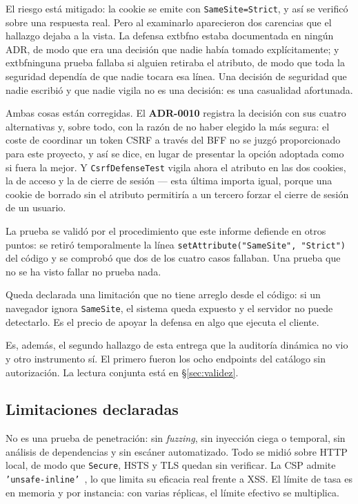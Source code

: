 \documentclass[11pt,a4paper]{article}
\newcommand{\adr}[1]{\textbf{ADR-#1}}
\begin{document}
El riesgo está mitigado: la cookie se emite con \texttt{SameSite=Strict}, y así
se verificó sobre una respuesta real. Pero al examinarlo aparecieron dos
carencias que el hallazgo dejaba a la vista. La defensa 	extbf{no estaba documentada
en ningún ADR}, de modo que era una decisión que nadie había tomado
explícitamente; y 	extbf{ninguna prueba fallaba si alguien retiraba el atributo}, de
modo que toda la seguridad dependía de que nadie tocara esa línea. Una decisión
de seguridad que nadie escribió y que nadie vigila no es una decisión: es una
casualidad afortunada.

Ambas cosas están corregidas. El \adr{0010} registra la decisión con sus cuatro
alternativas y, sobre todo, con la razón de no haber elegido la más segura: el
coste de coordinar un token CSRF a través del BFF no se juzgó proporcionado para
este proyecto, y así se dice, en lugar de presentar la opción adoptada como si
fuera la mejor. Y \texttt{CsrfDefenseTest} vigila ahora el atributo en las dos
cookies, la de acceso y la de cierre de sesión --- esta última importa igual,
porque una cookie de borrado sin el atributo permitiría a un tercero forzar el
cierre de sesión de un usuario.

La prueba se validó por el procedimiento que este informe defiende en otros
puntos: se retiró temporalmente la línea \texttt{setAttribute("SameSite",
"Strict")} del código y se comprobó que dos de los cuatro casos fallaban. Una
prueba que no se ha visto fallar no prueba nada.

Queda declarada una limitación que no tiene arreglo desde el código: si un
navegador ignora \texttt{SameSite}, el sistema queda expuesto y el servidor no
puede detectarlo. Es el precio de apoyar la defensa en algo que ejecuta el
cliente.

Es, además, el segundo hallazgo de esta entrega que la auditoría dinámica no vio
y otro instrumento sí. El primero fueron los ocho endpoints del catálogo sin
autorización. La lectura conjunta está en §\ref{sec:validez}.

\subsection{Limitaciones declaradas}

No es una prueba de penetración: sin \emph{fuzzing}, sin inyección ciega o
temporal, sin análisis de dependencias y sin escáner automatizado. Todo se midió
sobre HTTP local, de modo que \texttt{Secure}, HSTS y TLS quedan sin verificar.
La CSP admite \texttt{'unsafe-inline'}~\cite{cspl3}, lo que limita su eficacia
real frente a XSS. El límite de tasa es en memoria y por instancia: con varias
réplicas, el límite efectivo se multiplica.
\end{document}
